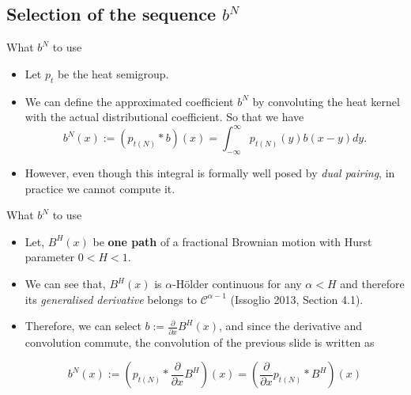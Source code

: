 \documentclass{beamer}
\begin{document}
\subsection{Selection of the sequence $ b^{N} $}
\begin{frame}{What $ b^{N} $ to use}
	\begin{itemize}
		\item<1->
			Let
			$ p_{t} $
			be the heat semigroup.
		\item<2->
			We can define the approximated coefficient 
			$ b^{N} $
			by convoluting the heat kernel with the actual distributional coefficient. So that we have
			\begin{equation*}
			    \label{eq:conv_der}
			    b^{N}(x) := (p_{t(N)} \ast b)(x) = \int_{-\infty}^{\infty} p_{t(N)} (y) b(x - y) dy.
			\end{equation*}
	    \item<3->
			However, even though this integral is formally well posed by
			\textit{dual pairing}, 
			in practice we cannot compute it.
	\end{itemize}
\end{frame}

\begin{frame}{What $ b^{N} $ to use}
	\begin{itemize}
		\item<1->
			Let,
			$ B^{H}(x) $
			be
			\textbf{one path}
			of a fractional Brownian motion with Hurst parameter
			$ 0 < H < 1 $.

		\item<2->
			We can see that, 
			$ B^{H}(x) $
			is
			$ \alpha $-Hölder 
			continuous for any
			$ \alpha < H $
			and therefore its
			\textit{generalised derivative}
			belongs to
			$ \mathcal{C}^{\alpha-1} $
			({\color{blue}Issoglio 2013, Section 4.1}).

		\item<3->
			Therefore, we can select
			$ b := \frac{\partial}{\partial x} B^{H}(x) $,
			and since the derivative and convolution commute, the convolution of the previous slide is written as

			\begin{equation*}
			    \label{eq:conv}
			    b^{N}(x) := \left(p_{t(N)} \ast \frac{\partial}{\partial x} B^{H}\right)(x) = \left(\frac{\partial}{\partial x} p_{t(N)} \ast B^{H}\right)(x) 
			\end{equation*}
	\end{itemize}
\end{frame}
\end{document}
